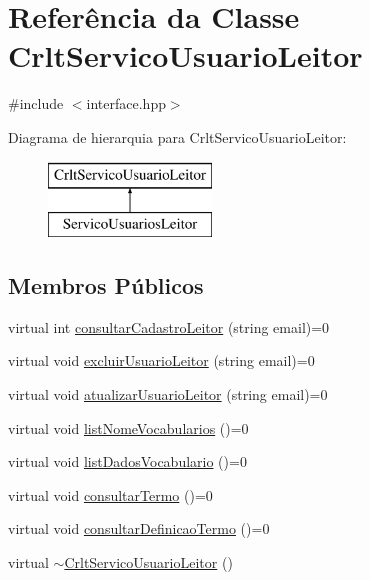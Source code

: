 \hypertarget{class_crlt_servico_usuario_leitor}{}\section{Referência da Classe Crlt\+Servico\+Usuario\+Leitor}
\label{class_crlt_servico_usuario_leitor}


{\ttfamily \#include $<$interface.\+hpp$>$}

Diagrama de hierarquia para Crlt\+Servico\+Usuario\+Leitor\+:\begin{figure}[H]
\begin{center}
\leavevmode
\includegraphics[height=2.000000cm]{class_crlt_servico_usuario_leitor}
\end{center}
\end{figure}
\subsection*{Membros Públicos}
\begin{DoxyCompactItemize}
\item 
virtual int \mbox{\hyperlink{class_crlt_servico_usuario_leitor_a4585305b98f21fe233b2c798edb47496}{consultar\+Cadastro\+Leitor}} (string email)=0
\item 
virtual void \mbox{\hyperlink{class_crlt_servico_usuario_leitor_a8318d7e7dadd648346aeda87fbcd5bca}{excluir\+Usuario\+Leitor}} (string email)=0
\item 
virtual void \mbox{\hyperlink{class_crlt_servico_usuario_leitor_a075822102b4f3cbf1805507d8b78fde8}{atualizar\+Usuario\+Leitor}} (string email)=0
\item 
virtual void \mbox{\hyperlink{class_crlt_servico_usuario_leitor_acfe203ebb5de6884bd4eb5d6167c781f}{list\+Nome\+Vocabularios}} ()=0
\item 
virtual void \mbox{\hyperlink{class_crlt_servico_usuario_leitor_a44a3bc16ef0888d8ce7dd0c9f03fdc58}{list\+Dados\+Vocabulario}} ()=0
\item 
virtual void \mbox{\hyperlink{class_crlt_servico_usuario_leitor_a4b381e72dddde7fffc5a75328dbf3198}{consultar\+Termo}} ()=0
\item 
virtual void \mbox{\hyperlink{class_crlt_servico_usuario_leitor_aefac628815c948981d03e2ad00033b47}{consultar\+Definicao\+Termo}} ()=0
\item 
virtual \mbox{\hyperlink{class_crlt_servico_usuario_leitor_a8d4b033edfd0622f1c82cbd40b2bb293}{$\sim$\+Crlt\+Servico\+Usuario\+Leitor}} ()
\end{DoxyCompactItemize}


